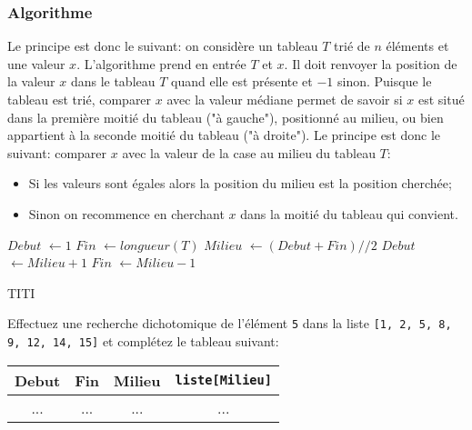 \documentclass[12pt]{article}
\begin{document}
	\subsubsection*{Algorithme}	
	Le principe est donc le suivant: on considère un tableau $T$ trié de $n$ éléments et une valeur $x$. L’algorithme prend en entrée $T$ et $x$. Il doit renvoyer la position de la valeur $x$ dans le tableau $T$ quand elle est présente et $-1$ sinon. Puisque le tableau est trié, comparer $x$ avec la valeur médiane permet de savoir si $x$ est situé dans la première moitié du tableau ("à gauche"), positionné au milieu, ou bien appartient à la seconde moitié du tableau ("à droite"). Le principe est donc le suivant: comparer $x$ avec la valeur de la case au milieu du tableau $T$:
	
	\begin{itemize}
		\item Si les valeurs sont égales alors la position du milieu est la position cherchée;
		\item Sinon on recommence en cherchant $x$ dans la moitié du tableau qui convient.
	\end{itemize}

	
	\begin{MaReponse}
		\begin{algorithmic}[1]
			\State $Debut$ $\leftarrow 1$
			\State $Fin$ $\leftarrow longueur(T)$
			\State $Milieu$ $\leftarrow (Debut + Fin) // 2$
			\State{}
			\State $Debut$ $\leftarrow Milieu + 1$
			\Else
			\State $Fin$ $\leftarrow Milieu - 1$
			\EndIf
			\EndWhile
			\State{}
			\EndFunction
		\end{algorithmic}
	\end{MaReponse}	
	
	
	\begin{MonExo}[TOTO]
		TITI
	\end{MonExo}
	
	\begin{MonExo}
		Effectuez une recherche dichotomique de l'élément \texttt{5} dans la liste \texttt{[1, 2, 5, 8, 9, 12, 14, 15]} et complétez le tableau suivant:
		
		\begin{tabular}{|c|c|c|c|}
			\hline
			\textbf{Debut} & \textbf{Fin} & \textbf{Milieu} & \textbf{\texttt{liste[Milieu]}}\\
			\hline
			... & ... & ... & ...\\
			\hline 
		\end{tabular}
	\end{MonExo}
	
\end{document}
